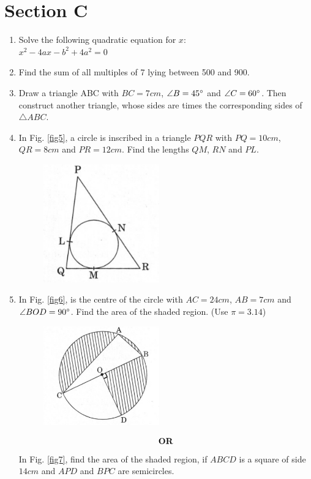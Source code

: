 \documentclass[journal,12pt,twocolumn]{IEEEtran}
\renewcommand\thesection{\arabic{section}}
\begin{document}
\section{Section C}
\renewcommand{\theequation}{\theenumi}
\begin{enumerate}[label=\thesection.\arabic*.,ref=\thesection.\theenumi]
\item Solve the following quadratic equation for $x:$ \\
$x^2-4ax-b^2+4a^2=0$\\
\item Find the sum of all multiples of 7 lying between 500 and 900. \\
\item Draw a triangle ABC with $BC = 7cm$, $\angle B = 45\degree$ and $\angle C = 60\degree$. Then construct another triangle, whose sides are times the corresponding sides of  $\triangle ABC.$ \\
\item In Fig. \ref{fig5}, a circle is inscribed in a triangle $PQR$ with $PQ = 10cm$, $QR = 8cm$ and $PR = 12cm$. Find the lengths $QM$, $RN$ and $PL$.\\

\begin{figure}[h!]
    \centering
    \includegraphics[width=5cm]{5.png}
 \end{figure}
\label{fig5}
\item In Fig. \ref{fig6}, is the centre of the circle with $AC = 24cm$, $AB=7cm$ and $\angle BOD = 90\degree$. Find the area of the shaded region. (Use $\pi = 3.14$)\\

\begin{figure}[h!]
    \centering
    \includegraphics[width=5cm]{6.png}
 \end{figure}
\begin{align}
    \centering \vec{OR}\nonumber
\end{align}
In Fig. \ref{fig7}, find the area of the shaded region, if $ABCD$ is a square of side $14 cm$ and $APD$ and $BPC$ are semicircles.\\


\end{enumerate}
\end{document}
